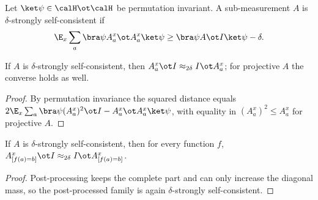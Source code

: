 \begin{definition}\label{def:strong-self-consistency}
	\leanok
	Let $\ket\psi\in\calH\ot\calH$ be permutation invariant.  A sub-measurement
	$A$ is $\delta$-strongly self-consistent if
	\[
		\E_x\sum_a\bra\psi A^x_a\ot A^x_a\ket\psi\ge\bra\psi A\ot I\ket\psi-\delta.
	\]
\end{definition}

\begin{proposition}\label{prop:two-notions-of-self-consistency}
	\leanok
	If $A$ is $\delta$-strongly self-consistent, then
	$A^x_a\ot I\approx_{2\delta}I\ot A^x_a$; for projective $A$ the converse
	holds as well.
\end{proposition}
\begin{proof}
	\leanok
	By permutation invariance the squared distance equals
	$2\E_x\sum_a\bra\psi(A^x_a)^2\ot I-A^x_a\ot A^x_a\ket\psi$, with equality
	in $(A^x_a)^2\le A^x_a$ for projective $A$.
\end{proof}

\begin{proposition}\label{prop:two-notions-of-self-consistency-after-evaluation}
	\leanok
	If $A$ is $\delta$-strongly self-consistent, then for every function $f$,
	$A^x_{[f(a)=b]}\ot I\approx_{2\delta}I\ot A^x_{[f(a)=b]}$.
\end{proposition}
\begin{proof}
	\leanok
	Post-processing keeps the complete part and can only increase the diagonal
	mass, so the post-processed family is again $\delta$-strongly
	self-consistent.
\end{proof}
